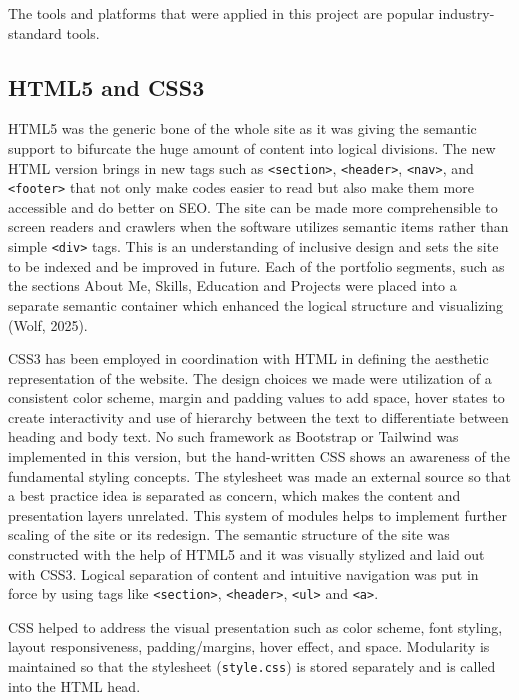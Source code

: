 \documentclass[11pt,a4paper]{article}
\begin{document}
The tools and platforms that were applied in this project are popular industry-standard tools.

\subsection*{HTML5 and CSS3}

HTML5 was the generic bone of the whole site as it was giving the semantic support to bifurcate the huge amount of content into logical divisions. The new HTML version brings in new tags such as \texttt{<section>}, \texttt{<header>}, \texttt{<nav>}, and \texttt{<footer>} that not only make codes easier to read but also make them more accessible and do better on SEO. The site can be made more comprehensible to screen readers and crawlers when the software utilizes semantic items rather than simple \texttt{<div>} tags. This is an understanding of inclusive design and sets the site to be indexed and be improved in future. Each of the portfolio segments, such as the sections About Me, Skills, Education and Projects were placed into a separate semantic container which enhanced the logical structure and visualizing (Wolf, 2025).

CSS3 has been employed in coordination with HTML in defining the aesthetic representation of the website. The design choices we made were utilization of a consistent color scheme, margin and padding values to add space, hover states to create interactivity and use of hierarchy between the text to differentiate between heading and body text. No such framework as Bootstrap or Tailwind was implemented in this version, but the hand-written CSS shows an awareness of the fundamental styling concepts. The stylesheet was made an external source so that a best practice idea is separated as concern, which makes the content and presentation layers unrelated. This system of modules helps to implement further scaling of the site or its redesign.
The semantic structure of the site was constructed with the help of HTML5 and it was visually stylized and laid out with CSS3. Logical separation of content and intuitive navigation was put in force by using tags like \texttt{<section>}, \texttt{<header>}, \texttt{<ul>} and \texttt{<a>}.

CSS helped to address the visual presentation such as color scheme, font styling, layout responsiveness, padding/margins, hover effect, and space. Modularity is maintained so that the stylesheet (\texttt{style.css}) is stored separately and is called into the HTML head.
\end{document}
